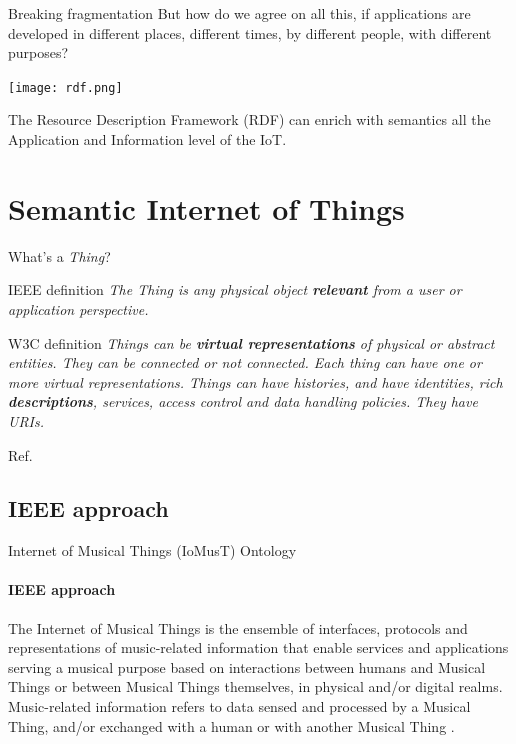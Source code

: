 \documentclass{beamer}
\begin{document}
\begin{frame}{Breaking fragmentation}
But how do we agree on all this, if applications are developed 
in different places, different times, by different people, with different purposes?

\texttt{[image: rdf.png]}

The Resource Description Framework (RDF) can enrich with semantics all the Application and Information level of the IoT.
\end{frame}

\section{Semantic Internet of Things}
\begin{frame}{What's a \textit{Thing}?}
\begin{block}{IEEE definition}
\textit{The Thing is any physical object \textbf{relevant} from a user or application perspective.}
\end{block} \pause
\begin{block}{W3C definition}
\textit{Things can be \textbf{virtual representations} of physical or abstract entities. They can be connected or not connected. Each thing can have one or more virtual representations. Things can have histories, and have identities, rich \textbf{descriptions}, services, access control and data handling policies. They have URIs.}
\end{block}
\vfill
\footnotesize{Ref. \cite{liu2016comparison}}
\end{frame}

\subsection{IEEE approach}
\begin{frame}{Internet of Musical Things (IoMusT) Ontology}
\framesubtitle{IEEE approach}
\begin{flushleft}
The Internet of Musical Things is the ensemble of interfaces, protocols and representations of music-related information that enable services and applications serving a musical purpose based on interactions between humans and Musical Things or between Musical Things themselves, in physical and/or digital realms.\\
\vspace{1mm}
Music-related information refers to data sensed and processed by a Musical Thing, and/or exchanged with a human or with another Musical Thing \cite{turchet2018IoMusT}.
\end{flushleft}
\end{frame}
\end{document}

